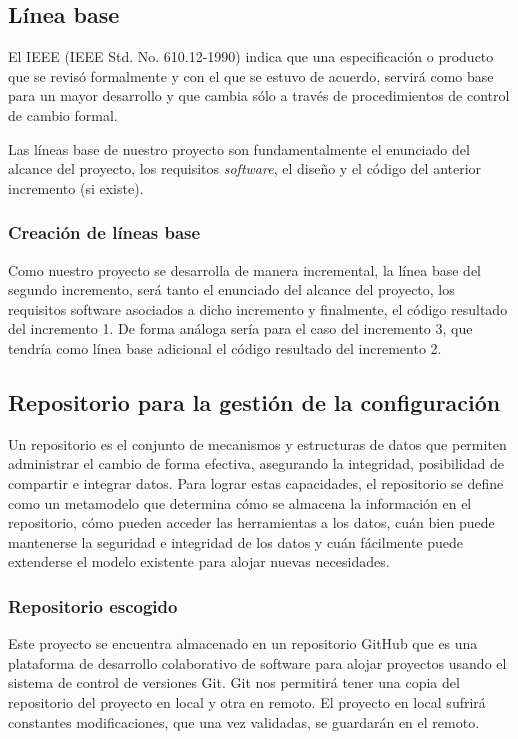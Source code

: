 \subsection{Línea base}
El IEEE (IEEE Std. No. 610.12-1990) indica que una especificación o producto que se revisó formalmente y con el que se estuvo de acuerdo, servirá como base para un mayor desarrollo y que cambia sólo a través de procedimientos de control de cambio formal.


Las líneas base de nuestro proyecto son fundamentalmente el enunciado del alcance del proyecto, los requisitos \textit{software}, el diseño y el código del anterior incremento (si existe).

\subsubsection{Creación de líneas base}
Como nuestro proyecto se desarrolla de manera incremental, la línea base del segundo incremento, será tanto el enunciado del alcance del proyecto, los requisitos software asociados a dicho incremento y finalmente, el código resultado del incremento 1. De forma análoga sería para el caso del incremento 3, que tendría como línea base adicional el código resultado del incremento 2.

\subsection{Repositorio para la gestión de la configuración}
Un repositorio es el conjunto de mecanismos y estructuras de datos que permiten administrar el cambio de forma efectiva, asegurando la integridad, posibilidad de compartir e integrar datos. Para lograr estas capacidades, el repositorio se define como un metamodelo que determina cómo se almacena la información en el repositorio, cómo pueden acceder las herramientas a los datos, cuán bien puede mantenerse la seguridad e integridad de los datos y cuán fácilmente puede extenderse el modelo existente para alojar nuevas necesidades\cite{pressman}.

\subsubsection{Repositorio escogido}
Este proyecto se encuentra almacenado en un repositorio GitHub que es una plataforma de desarrollo colaborativo de software para alojar proyectos usando el sistema de control de versiones Git\cite{github}. Git nos permitirá tener una copia del repositorio del proyecto en local y otra en remoto. El proyecto en local sufrirá constantes modificaciones, que una vez validadas, se guardarán en el remoto.


